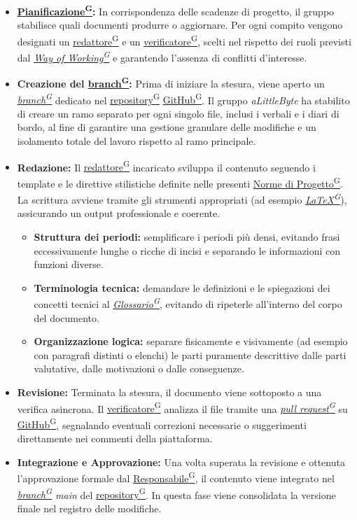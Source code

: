 \documentclass[a4paper,12pt]{article}
\providecommand{\glslink}[2]{\href{https://alittlebyte-19.github.io/Documentazione/glossario.html\#gls-#1}{\underline{#2}\textsuperscript{\scriptsize G}}}
\begin{document}
\begin{itemize}
    \item \textbf{\glslink{pianificazione}{Pianificazione}:} In corrispondenza delle scadenze di progetto, il gruppo stabilisce quali documenti produrre o aggiornare. Per ogni compito vengono designati un \glslink{redattore}{redattore} e un \glslink{verificatore}{verificatore}, scelti nel rispetto dei ruoli previsti dal \textit{\glslink{way-of-working-wow}{Way of Working}} e garantendo l'assenza di conflitti d'interesse.
    
    \item \textbf{Creazione del \glslink{branch}{branch}:} Prima di iniziare la stesura, viene aperto un \textit{\glslink{branch}{branch}} dedicato nel \glslink{repository}{repository} \glslink{github}{GitHub}. Il gruppo \textit{aLittleByte} ha stabilito di creare un ramo separato per ogni singolo file, inclusi i verbali e i diari di bordo, al fine di garantire una gestione granulare delle modifiche e un isolamento totale del lavoro rispetto al ramo principale.
    
    \item \textbf{Redazione:} Il \glslink{redattore}{redattore} incaricato sviluppa il contenuto seguendo i template e le direttive stilistiche definite nelle presenti \glslink{norme-di-progetto}{Norme di Progetto}. La scrittura avviene tramite gli strumenti appropriati (ad esempio \textit{\glslink{latex}{LaTeX}}), assicurando un output professionale e coerente.
    \begin{itemize}
    \item \textbf{Struttura dei periodi:} semplificare i periodi più densi, evitando frasi eccessivamente lunghe o ricche di incisi e separando le informazioni con funzioni diverse.
    \item \textbf{Terminologia tecnica:} demandare le definizioni e le spiegazioni dei concetti tecnici al \textit{\glslink{glossario}{Glossario}}, evitando di ripeterle all'interno del corpo del documento.
    \item \textbf{Organizzazione logica:} separare fisicamente e visivamente (ad esempio con paragrafi distinti o elenchi) le parti puramente descrittive dalle parti valutative, dalle motivazioni o dalle conseguenze.
    \end{itemize}
    
    \item \textbf{Revisione:} Terminata la stesura, il documento viene sottoposto a una verifica asincrona. Il \glslink{verificatore}{verificatore} analizza il file tramite una \textit{\glslink{pull-request}{pull request}} su \glslink{github}{GitHub}, segnalando eventuali correzioni necessarie o suggerimenti direttamente nei commenti della piattaforma.
    
    \item \textbf{Integrazione e Approvazione:} Una volta superata la revisione e ottenuta l'approvazione formale dal \glslink{responsabile}{Responsabile}, il contenuto viene integrato nel \textit{\glslink{branch}{branch} main} del \glslink{repository}{repository}. In questa fase viene consolidata la versione finale nel registro delle modifiche.

\end{itemize}
\end{document}
